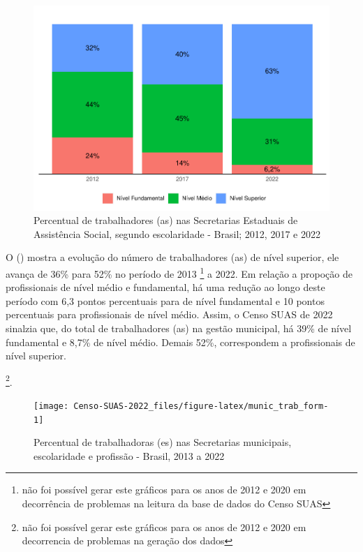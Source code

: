 \documentclass[
  brazilian]{report}
\begin{document}
\begin{figure}
\includegraphics{Censo-SUAS-2022_files/figure-latex/uf_trab_form-1} \caption[Percentual de trabalhadores (as) nas Secretarias Estaduais de Assistência Social, segundo escolaridade - Brasil]{Percentual de trabalhadores (as) nas Secretarias Estaduais de Assistência Social, segundo escolaridade - Brasil; 2012, 2017 e 2022}\label{fig:uf_trab_form}
\end{figure}

O () mostra a evolução do número de
trabalhadores (as) de nível superior, ele avança de 36\% para 52\% no
período de 2013
\footnote{não foi possível gerar este gráficos para os anos de 2012 e 2020 em decorrência de problemas na leitura da base de dados do Censo SUAS}
a 2022. Em relação a propoção de profissionais de nível médio e
fundamental, há uma redução ao longo deste período com 6,3 pontos
percentuais para de nível fundamental e 10 pontos percentuais para
profissionais de nível médio. Assim, o Censo SUAS de 2022 sinalzia que,
do total de trabalhadores (as) na gestão municipal, há 39\% de nível
fundamental e 8,7\% de nível médio. Demais 52\%, correspondem a
profissionais de nível superior.

\footnote{não foi possível gerar este gráficos para os anos de 2012 e 2020 em decorrencia de problemas na geração dos dados}.

\begin{figure}
\texttt{[image: Censo-SUAS-2022\_files/figure-latex/munic\_trab\_form-1]} \caption[Percentual de trabalhadoras (es) nas Secretarias municipais, escolaridade e profissão - Brasil, 2013 a 2022]{Percentual de trabalhadoras (es) nas Secretarias municipais, escolaridade e profissão - Brasil, 2013 a 2022}\label{fig:munic_trab_form}
\end{figure}
\end{document}
